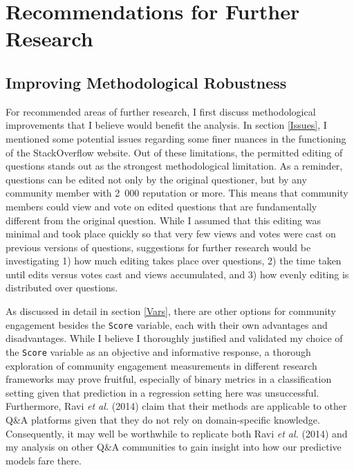 \documentclass[11pt,preprint, authoryear]{article}
\begin{document}
\section{\texorpdfstring{Recommendations for Further Research
\label{Recom}}{Recommendations for Further Research }}\label{recommendations-for-further-research}

\subsection{Improving Methodological
Robustness}\label{improving-methodological-robustness}

For recommended areas of further research, I first discuss
methodological improvements that I believe would benefit the analysis.
In section \ref{Issues}, I mentioned some potential issues regarding
some finer nuances in the functioning of the StackOverflow website. Out
of these limitations, the permitted editing of questions stands out as
the strongest methodological limitation. As a reminder, questions can be
edited not only by the original questioner, but by any community member
with 2~000 reputation or more. This means that community members could
view and vote on edited questions that are fundamentally different from
the original question. While I assumed that this editing was minimal and
took place quickly so that very few views and votes were cast on
previous versions of questions, suggestions for further research would
be investigating 1) how much editing takes place over questions, 2) the
time taken until edits versus votes cast and views accumulated, and 3)
how evenly editing is distributed over questions.

As discussed in detail in section \ref{Vars}, there are other options
for community engagement besides the \texttt{Score} variable, each with
their own advantages and disadvantages. While I believe I thoroughly
justified and validated my choice of the \texttt{Score} variable as an
objective and informative response, a thorough exploration of community
engagement measurements in different research frameworks may prove
fruitful, especially of binary metrics in a classification setting given
that prediction in a regression setting here was unsuccessful.
Furthermore, Ravi \emph{et al.} (2014) claim that their methods are
applicable to other Q\&A platforms given that they do not rely on
domain-specific knowledge. Consequently, it may well be worthwhile to
replicate both Ravi \emph{et al.} (2014) and my analysis on other Q\&A
communities to gain insight into how our predictive models fare there.
\end{document}
